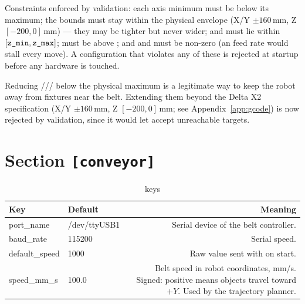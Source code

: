 Constraints enforced by validation: each axis minimum must be below its
maximum; the bounds must stay within the physical envelope (X/Y
$\pm 160$\,mm, Z $[-200, 0]$\,mm) --- they may be tighter but never wider;
 and  must lie within
$[\texttt{z\_min}, \texttt{z\_max}]$;  must be above
; and  and  must be non-zero
(an  feed rate would stall every move). A configuration that
violates any of these is rejected at startup before any hardware is
touched.

\begin{warningbox}
  Reducing /// below the
  physical maximum is a legitimate way to keep the robot away from
  fixtures near the belt. Extending them beyond the Delta X2 specification
  (X/Y $\pm 160$\,mm, Z $[-200, 0]$\,mm; see Appendix~\ref{app:gcode}) is
  now rejected by validation, since it would let  accept
  unreachable targets.
\end{warningbox}

\section{Section \texttt{[conveyor]}}
%
\begin{table}[h]
  \centering
  \begin{tabularx}{\textwidth}{KTD}
    \toprule
    \textbf{Key} & \textbf{Default} & \textbf{Meaning} \\
    \midrule
    port\_name & /dev/ttyUSB1 & Serial device of the belt controller. \\
    baud\_rate & 115200 & Serial speed. \\
    default\_speed & 1000 & Raw  value sent with  on start. \\
    speed\_mm\_s & 100.0 & Belt speed in robot coordinates, mm/s. Signed:
      positive means objects travel toward $+Y$. Used by the trajectory
      planner. \\
    \bottomrule
  \end{tabularx}
  \caption{\cfg{[conveyor]} keys}
\end{table}

